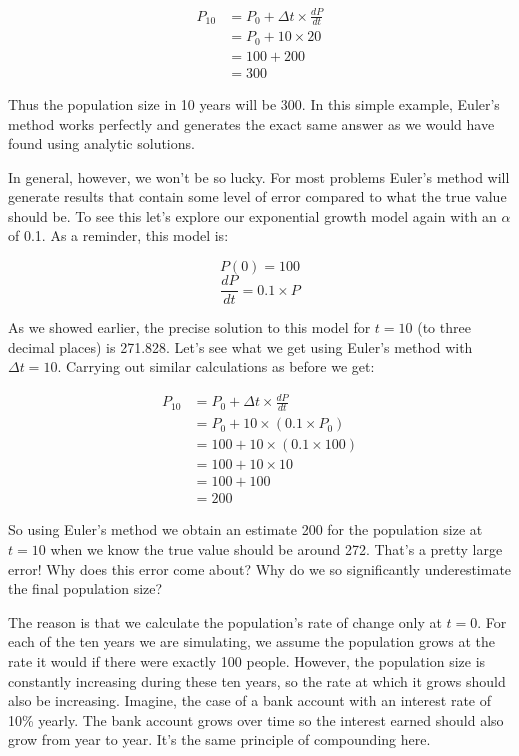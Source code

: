 \documentclass[]{memoir}
\begin{document}
\[
\begin{aligned}
P_{10} &= P_0 + \Delta t \times \frac{dP}{dt} \\
&= P_0 + 10 \times 20 \\
&= 100 + 200 \\
&= 300
\end{aligned}
\]

Thus the population size in 10 years will be 300. In this simple
example, Euler's method works perfectly and generates the exact same
answer as we would have found using analytic solutions.

In general, however, we won't be so lucky. For most problems Euler's
method will generate results that contain some level of error compared
to what the true value should be. To see this let's explore our
exponential growth model again with an $\alpha$ of 0.1. As a reminder,
this model is:

\[ P(0) = 100 \] \[ \frac{dP}{dt} = 0.1 \times P \]

As we showed earlier, the precise solution to this model for $t=10$ (to
three decimal places) is 271.828. Let's see what we get using Euler's
method with $\Delta t = 10$. Carrying out similar calculations as before
we get:

\[
\begin{aligned}
P_{10} &= P_0 + \Delta t \times \frac{dP}{dt} \\
&= P_0 + 10 \times (0.1 \times P_0) \\
&= 100 + 10 \times (0.1 \times 100) \\
&= 100 + 10 \times 10 \\
&= 100 + 100 \\
&= 200
\end{aligned}
\]

So using Euler's method we obtain an estimate 200 for the population
size at $t=10$ when we know the true value should be around 272. That's
a pretty large error! Why does this error come about? Why do we so
significantly underestimate the final population size?

The reason is that we calculate the population's rate of change only at
$t=0$. For each of the ten years we are simulating, we assume the
population grows at the rate it would if there were exactly 100 people.
However, the population size is constantly increasing during these ten
years, so the rate at which it grows should also be increasing. Imagine,
the case of a bank account with an interest rate of 10\% yearly. The
bank account grows over time so the interest earned should also grow
from year to year. It's the same principle of compounding here.
\end{document}
